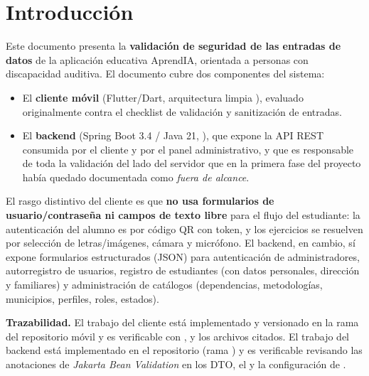 \documentclass[11pt,a4paper]{article}
\begin{document}
\newpage
\tableofcontents
\newpage

\section{Introducción}

Este documento presenta la \textbf{validación de seguridad de las entradas de datos} de la aplicación educativa AprendIA, orientada a personas con discapacidad auditiva. El documento cubre dos componentes del sistema:

\begin{itemize}[leftmargin=1.5cm]
    \item El \textbf{cliente móvil} (Flutter/Dart, arquitectura limpia \texttt{}), evaluado originalmente contra el checklist de validación y sanitización de entradas.
    \item El \textbf{backend} (Spring Boot 3.4 / Java 21, \texttt{}), que expone la API REST consumida por el cliente y por el panel administrativo, y que es responsable de toda la validación del lado del servidor que en la primera fase del proyecto había quedado documentada como \emph{fuera de alcance}.

\end{itemize}

El rasgo distintivo del cliente es que \textbf{no usa formularios de usuario/contraseña ni campos de texto libre} para el flujo del estudiante: la autenticación del alumno es por código QR con token, y los ejercicios se resuelven por selección de letras/imágenes, cámara y micrófono. El backend, en cambio, sí expone formularios estructurados (JSON) para autenticación de administradores, autorregistro de usuarios, registro de estudiantes (con datos personales, dirección y familiares) y administración de catálogos (dependencias, metodologías, municipios, perfiles, roles, estados).

\textbf{Trazabilidad.} El trabajo del cliente está implementado y versionado en la rama \texttt{} del repositorio móvil y es verificable con \texttt{}, \texttt{} y los archivos citados. El trabajo del backend está implementado en el repositorio \texttt{} (rama \texttt{}) y es verificable revisando las anotaciones de \emph{Jakarta Bean Validation} en los DTO, el \texttt{} y la configuración de \texttt{}.
\end{document}
